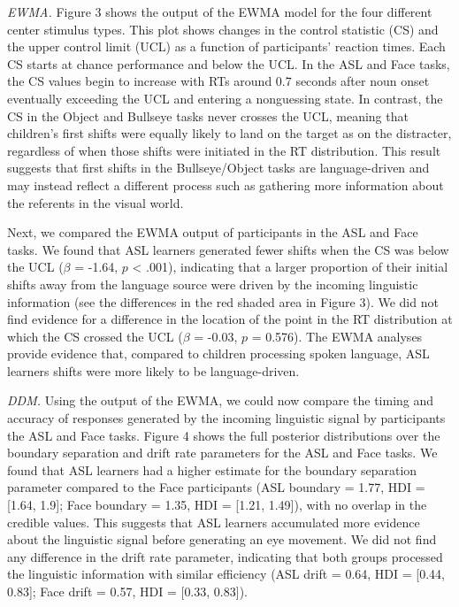 \documentclass[10pt, letterpaper]{article}
\begin{document}
\emph{EWMA.} Figure 3 shows the output of the EWMA model for the four
different center stimulus types. This plot shows changes in the control
statistic (CS) and the upper control limit (UCL) as a function of
participants' reaction times. Each CS starts at chance performance and
below the UCL. In the ASL and Face tasks, the CS values begin to
increase with RTs around 0.7 seconds after noun onset eventually
exceeding the UCL and entering a nonguessing state. In contrast, the CS
in the Object and Bullseye tasks never crosses the UCL, meaning that
children's first shifts were equally likely to land on the target as on
the distracter, regardless of when those shifts were initiated in the RT
distribution. This result suggests that first shifts in the
Bullseye/Object tasks are language-driven and may instead reflect a
different process such as gathering more information about the referents
in the visual world.

Next, we compared the EWMA output of participants in the ASL and Face
tasks. We found that ASL learners generated fewer shifts when the CS was
below the UCL (\(\beta\) = -1.64, \(p\) \textless{} .001), indicating
that a larger proportion of their initial shifts away from the language
source were driven by the incoming linguistic information (see the
differences in the red shaded area in Figure 3). We did not find
evidence for a difference in the location of the point in the RT
distribution at which the CS crossed the UCL (\(\beta\) = -0.03, \(p\) =
0.576). The EWMA analyses provide evidence that, compared to children
processing spoken language, ASL learners shifts were more likely to be
language-driven.

\emph{DDM.} Using the output of the EWMA, we could now compare the
timing and accuracy of responses generated by the incoming linguistic
signal by participants the ASL and Face tasks. Figure 4 shows the full
posterior distributions over the boundary separation and drift rate
parameters for the ASL and Face tasks. We found that ASL learners had a
higher estimate for the boundary separation parameter compared to the
Face participants (ASL boundary = 1.77, HDI = {[}1.64, 1.9{]}; Face
boundary = 1.35, HDI = {[}1.21, 1.49{]}), with no overlap in the
credible values. This suggests that ASL learners accumulated more
evidence about the linguistic signal before generating an eye movement.
We did not find any difference in the drift rate parameter, indicating
that both groups processed the linguistic information with similar
efficiency (ASL drift = 0.64, HDI = {[}0.44, 0.83{]}; Face drift = 0.57,
HDI = {[}0.33, 0.83{]}).
\end{document}
